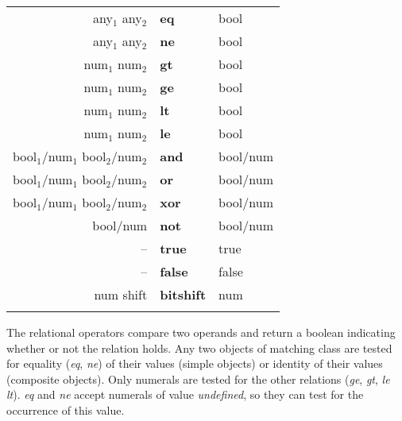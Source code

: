 \begin{tabular}{>{\sffamily}r>{\sffamily\bfseries}l>{\sffamily}l}
any$_1$ any$_2$ & eq              & bool\\
any$_1$ any$_2$                   & ne       & bool\\
num$_1$ num$_2$                   & gt       & bool\\
num$_1$ num$_2$                   & ge       & bool\\
num$_1$ num$_2$                   & lt       & bool\\
num$_1$ num$_2$                   & le       & bool\\
bool$_1$/num$_1$ bool$_2$/num$_2$ & and      & bool/num\\
bool$_1$/num$_1$ bool$_2$/num$_2$ & or       & bool/num\\
bool$_1$/num$_1$ bool$_2$/num$_2$ & xor      & bool/num\\
bool/num                          & not      & bool/num\\
--                                & true     & true\\
--                                & false    & false\\
num shift                         & bitshift & num\\\\
\end{tabular}


The  relational  operators  compare two operands  and  return  a  boolean indicating whether or not the relation holds.  Any two objects of matching class are tested for equality (\emph{eq}, \emph{ne}) of their values (simple objects) or identity of their values (composite objects). Only numerals are tested for the other relations (\emph{ge},  \emph{gt}, \emph{le} \emph{lt}). \emph{eq} and \emph{ne} accept numerals of value \emph{undefined}, so they can test for the occurrence of this value.

